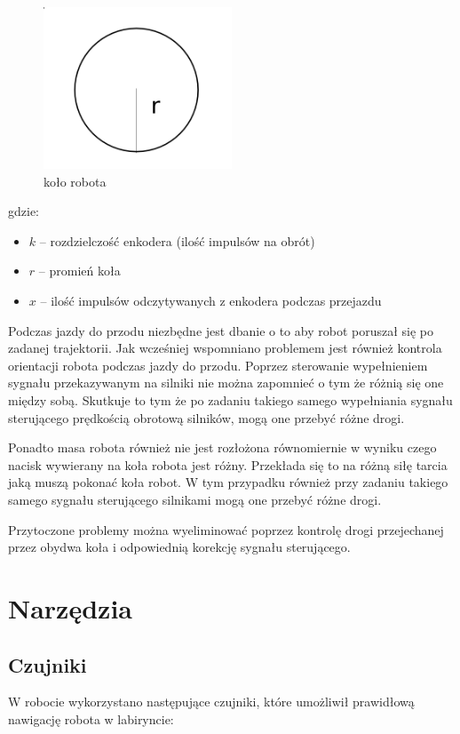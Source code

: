\documentclass[12pt,a4paper,twoside,openright,fleqn]{mwrep}
\begin{document}
\begin{figure}[h]
\centering
\includegraphics[width=0.5\textwidth]{./images/wheel_r}
\caption{koło robota}
\label{wheel_r}
\end{figure}


gdzie:

\begin{itemize}
    \item $k$ -- rozdzielczość enkodera (ilość impulsów na obrót)
    \item $r$ -- promień koła
    \item $x$ -- ilość impulsów odczytywanych z enkodera podczas przejazdu
\end{itemize}

Podczas jazdy do przodu niezbędne jest dbanie o to aby robot poruszał się po zadanej trajektorii. Jak wcześniej wspomniano problemem jest również kontrola orientacji robota podczas jazdy do przodu. Poprzez sterowanie wypełnieniem sygnału przekazywanym na silniki nie można zapomnieć o tym że różnią się one między sobą. Skutkuje to tym że po zadaniu takiego samego wypełniania sygnału sterującego prędkością obrotową silników, mogą one przebyć różne drogi. 

Ponadto masa robota również nie jest rozłożona równomiernie w wyniku czego nacisk wywierany na koła robota jest różny. Przekłada się to na różną siłę tarcia jaką muszą pokonać koła robot. W tym przypadku również przy zadaniu takiego samego sygnału sterującego silnikami mogą one przebyć różne drogi.

Przytoczone problemy można wyeliminować poprzez kontrolę drogi przejechanej przez obydwa koła i odpowiednią korekcję sygnału sterującego. 


\chapter{Narzędzia} 

\section{Czujniki} 
W robocie wykorzystano następujące czujniki, które umożliwił prawidłową nawigację robota w labiryncie:
\end{document}
